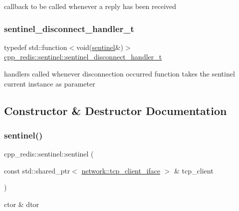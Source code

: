 callback to be called whenever a reply has been received \mbox{\label{classcpp__redis_1_1sentinel_a923e06b5b700c16dffec8a01d2fa9aa4}} 
\subsubsection{\texorpdfstring{sentinel\+\_\+disconnect\+\_\+handler\+\_\+t}{sentinel\_disconnect\_handler\_t}}
{\footnotesize\ttfamily typedef std\+::function$<$void(\hyperlink{classcpp__redis_1_1sentinel}{sentinel}\&)$>$ \hyperlink{classcpp__redis_1_1sentinel_a923e06b5b700c16dffec8a01d2fa9aa4}{cpp\+\_\+redis\+::sentinel\+::sentinel\+\_\+disconnect\+\_\+handler\+\_\+t}}

handlers called whenever disconnection occurred function takes the sentinel current instance as parameter 

\subsection{Constructor \& Destructor Documentation}
\mbox{\label{classcpp__redis_1_1sentinel_af53665f5834dfe5861a6310318ae5169}} 
\subsubsection{\texorpdfstring{sentinel()}{sentinel()}\hspace{0.1cm}{\footnotesize\ttfamily [1/2]}}
{\footnotesize\ttfamily cpp\+\_\+redis\+::sentinel\+::sentinel (\begin{DoxyParamCaption}\item[{const std\+::shared\+\_\+ptr$<$ \hyperlink{classcpp__redis_1_1network_1_1tcp__client__iface}{network\+::tcp\+\_\+client\+\_\+iface} $>$ \&}]{tcp\+\_\+client }\end{DoxyParamCaption})}



ctor \& dtor 

